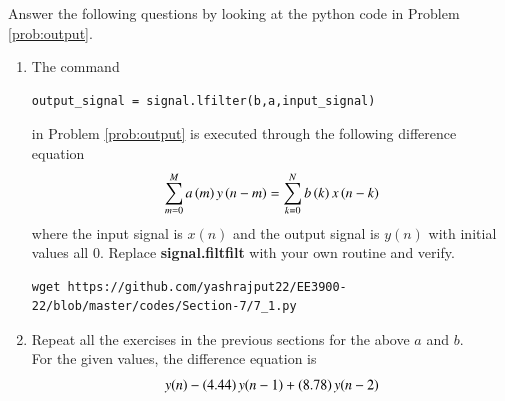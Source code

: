 \documentclass[journal,12pt,twocolumn]{IEEEtran}
\renewcommand\thesection{\arabic{section}}
\begin{document}
Answer the following questions by looking at the python code in Problem \ref{prob:output}.
\begin{enumerate}[label=\thesection.\arabic*]
\item
The command
\begin{lstlisting}
output_signal = signal.lfilter(b,a,input_signal)
\end{lstlisting}
in Problem \ref{prob:output} is executed through the following difference equation
\begin{equation}
\label{eq:iir_filter_gen}
 \sum _{m=0}^{M}a\left(m\right)y\left(n-m\right)=\sum _{k=0}^{N}b\left(k\right)x\left(n-k\right)
\end{equation}
%
where the input signal is $x(n)$ and the output signal is $y(n)$ with initial values all 0. Replace
\textbf{signal.filtfilt} with your own routine and verify.\\
\begin{lstlisting}
wget https://github.com/yashrajput22/EE3900-22/blob/master/codes/Section-7/7_1.py
\end{lstlisting}
\item Repeat all the exercises in the previous sections for the above $a$ and $b$.
\\
\solution
For the given values, the difference equation is
\begin{align}
	&y(n) - \brak{4.44}y(n - 1) + \brak{8.78}y(n - 2) \nonumber \\

\end{align}
\end{enumerate}
\end{document}
